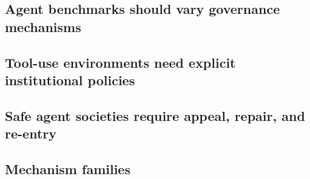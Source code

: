 \subsection{Agent benchmarks should vary governance mechanisms}
\subsection{Tool-use environments need explicit institutional policies}
\subsection{Safe agent societies require appeal, repair, and re-entry}



\subsection{Mechanism families}





